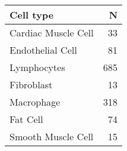 \begin{table}[ht]
\centering
\begin{tabular}{lr}
  \hline
Cell type & N \\ 
  \hline
Cardiac Muscle Cell &  33 \\ 
  Endothelial Cell &  81 \\ 
  Lymphocytes & 685 \\ 
  Fibroblast &  13 \\ 
  Macrophage & 318 \\ 
  Fat Cell &  74 \\ 
  Smooth Muscle Cell &  15 \\ 
   \hline
\end{tabular}
\end{table}
